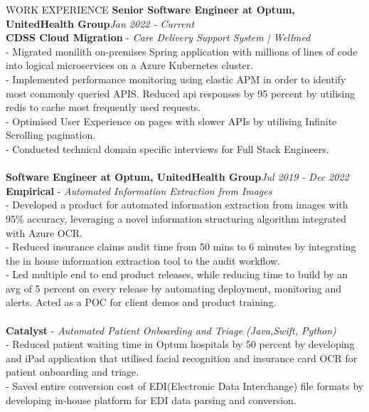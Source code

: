 \documentclass{resume} %
\begin{document}
\begin{rSection}{WORK EXPERIENCE}
{\bf Senior Software Engineer at Optum, UnitedHealth Group}\hfill {\em  Jan 2022 - Current}
\\ {\bf CDSS Cloud Migration} - {\em Care Delivery Support System | Wellmed}
\\ - Migrated monilith on-premises Spring application with millions of lines of code into logical microservices on a Azure Kubernetes cluster.
\\ - Implemented performance monitoring using elastic APM in order to identify most commonly queried APIS. Reduced api responses by 95 percent by utilising redis to cache most frequently used requests.
\\ - Optimised User Experience on pages with slower APIs by utilising Infinite Scrolling pagination.
\\ - Conducted technical domain specific interviews for Full Stack Engineers.
\\[-0.9em]
\\{\bf Software Engineer at Optum, UnitedHealth Group}\hfill {\em  Jul 2019 - Dec 2022}
\\{\bf Empirical} - {\em Automated Information Extraction from Images}
\\ - Developed a product for automated information extraction from images with 95\% accuracy, leveraging a novel information structuring algorithm integrated with Azure OCR.
\\ - Reduced insurance claims audit time from 50 mins to 6 minutes by integrating the in house information extraction tool to the audit workflow.
\\- Led multiple end to end product releases, while reducing time to build by an avg of 5 percent on every release by automating  deployment, monitoring and alerts. Acted as a POC for client demos and product training.
\\[-0.9em]
\\{\bf Catalyst} - {\em Automated Patient Onboarding and Triage (Java,Swift, Python)}
\\ - Reduced patient waiting time in Optum hospitals by 50 percent by developing and iPad application that utilised facial recognition and insurance card OCR for patient onboarding and triage.
\\ - Saved entire conversion cost of EDI(Electronic Data Interchange) file formats by developing in-house platform for EDI data parsing and conversion.

\end{rSection}
\end{document}
